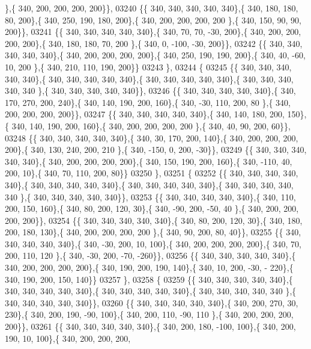 \begin{DoxyCode}
      \},\{ 340, 200, 200, 200, 200\}\},
03240 \{\{ 340, 340, 340, 340, 340\},\{ 340, 180, 180,  80, 200\},\{ 340, 250, 190, 180, 200\},\{ 340, 200, 200, 200, 200
      \},\{ 340, 150,  90,  90, 200\}\},
03241 \{\{ 340, 340, 340, 340, 340\},\{ 340,  70,  70, -30, 200\},\{ 340, 200, 200, 200, 200\},\{ 340, 180, 180,  70, 200
      \},\{ 340,   0, -100, -30, 200\}\},
03242 \{\{ 340, 340, 340, 340, 340\},\{ 340, 200, 200, 200, 200\},\{ 340, 250, 190, 190, 200\},\{ 340,  40, -60,  10, 200
      \},\{ 340, 210, 110, 190, 200\}\}
03243 \},
03244 \{
03245 \{\{ 340, 340, 340, 340, 340\},\{ 340, 340, 340, 340, 340\},\{ 340, 340, 340, 340, 340\},\{ 340, 340, 340, 340, 340
      \},\{ 340, 340, 340, 340, 340\}\},
03246 \{\{ 340, 340, 340, 340, 340\},\{ 340, 170, 270, 200, 240\},\{ 340, 140, 190, 200, 160\},\{ 340, -30, 110, 200,  80
      \},\{ 340, 200, 200, 200, 200\}\},
03247 \{\{ 340, 340, 340, 340, 340\},\{ 340, 140, 180, 200, 150\},\{ 340, 140, 190, 200, 160\},\{ 340, 200, 200, 200, 200
      \},\{ 340,  40,  90, 200,  60\}\},
03248 \{\{ 340, 340, 340, 340, 340\},\{ 340,  30, 170, 200, 140\},\{ 340, 200, 200, 200, 200\},\{ 340, 130, 240, 200, 210
      \},\{ 340, -150,   0, 200, -30\}\},
03249 \{\{ 340, 340, 340, 340, 340\},\{ 340, 200, 200, 200, 200\},\{ 340, 150, 190, 200, 160\},\{ 340, -110,  40, 200,  
      10\},\{ 340,  70, 110, 200,  80\}\}
03250 \},
03251 \{
03252 \{\{ 340, 340, 340, 340, 340\},\{ 340, 340, 340, 340, 340\},\{ 340, 340, 340, 340, 340\},\{ 340, 340, 340, 340, 340
      \},\{ 340, 340, 340, 340, 340\}\},
03253 \{\{ 340, 340, 340, 340, 340\},\{ 340, 110, 200, 150, 160\},\{ 340,  80, 200, 120,  30\},\{ 340, -90, 200, -50,  40
      \},\{ 340, 200, 200, 200, 200\}\},
03254 \{\{ 340, 340, 340, 340, 340\},\{ 340,  80, 200, 120,  30\},\{ 340, 180, 200, 180, 130\},\{ 340, 200, 200, 200, 200
      \},\{ 340,  90, 200,  80,  40\}\},
03255 \{\{ 340, 340, 340, 340, 340\},\{ 340, -30, 200,  10, 100\},\{ 340, 200, 200, 200, 200\},\{ 340,  70, 200, 110, 120
      \},\{ 340, -30, 200, -70, -260\}\},
03256 \{\{ 340, 340, 340, 340, 340\},\{ 340, 200, 200, 200, 200\},\{ 340, 190, 200, 190, 140\},\{ 340,  10, 200, -30, -
      220\},\{ 340, 190, 200, 150, 140\}\}
03257 \},
03258 \{
03259 \{\{ 340, 340, 340, 340, 340\},\{ 340, 340, 340, 340, 340\},\{ 340, 340, 340, 340, 340\},\{ 340, 340, 340, 340, 340
      \},\{ 340, 340, 340, 340, 340\}\},
03260 \{\{ 340, 340, 340, 340, 340\},\{ 340, 200, 270,  30, 230\},\{ 340, 200, 190, -90, 100\},\{ 340, 200, 110, -90, 110
      \},\{ 340, 200, 200, 200, 200\}\},
03261 \{\{ 340, 340, 340, 340, 340\},\{ 340, 200, 180, -100, 100\},\{ 340, 200, 190,  10, 100\},\{ 340, 200, 200, 200, 

\end{DoxyCode}
